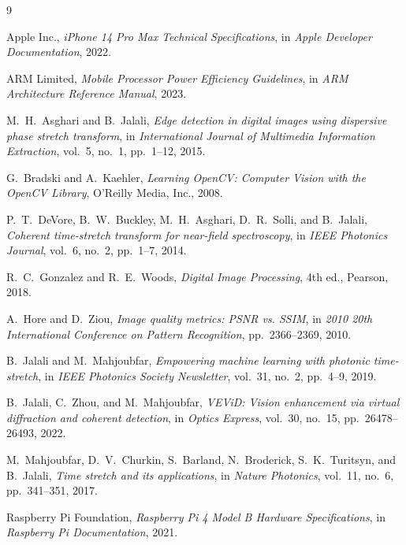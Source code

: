 \documentclass[journal,transmag]{IEEEtran}
\begin{document}
\begin{thebibliography}{9}

Apple Inc.,
\emph{iPhone 14 Pro Max Technical Specifications},
in \emph{Apple Developer Documentation}, 2022.

ARM Limited,
\emph{Mobile Processor Power Efficiency Guidelines},
in \emph{ARM Architecture Reference Manual}, 2023.

M.~H.~Asghari and B.~Jalali, 
\emph{Edge detection in digital images using dispersive phase stretch transform}, 
in \emph{International Journal of Multimedia Information Extraction}, vol.~5, no.~1, pp.~1--12, 2015.

G.~Bradski and A.~Kaehler, 
\emph{Learning OpenCV: Computer Vision with the OpenCV Library}, 
O'Reilly Media, Inc., 2008.

P.~T.~DeVore, B.~W.~Buckley, M.~H.~Asghari, D.~R.~Solli, and B.~Jalali, 
\emph{Coherent time-stretch transform for near-field spectroscopy}, 
in \emph{IEEE Photonics Journal}, vol.~6, no.~2, pp.~1--7, 2014.

R.~C.~Gonzalez and R.~E.~Woods, 
\emph{Digital Image Processing}, 4th ed., Pearson, 2018.

A.~Hore and D.~Ziou, 
\emph{Image quality metrics: PSNR vs. SSIM}, 
in \emph{2010 20th International Conference on Pattern Recognition}, pp.~2366--2369, 2010.

B.~Jalali and M.~Mahjoubfar, 
\emph{Empowering machine learning with photonic time-stretch}, 
in \emph{IEEE Photonics Society Newsletter}, vol.~31, no.~2, pp.~4--9, 2019.

B.~Jalali, C.~Zhou, and M.~Mahjoubfar, 
\emph{VEViD: Vision enhancement via virtual diffraction and coherent detection}, 
in \emph{Optics Express}, vol.~30, no.~15, pp.~26478--26493, 2022.

M.~Mahjoubfar, D.~V.~Churkin, S.~Barland, N.~Broderick, S.~K.~Turitsyn, and B.~Jalali, 
\emph{Time stretch and its applications}, 
in \emph{Nature Photonics}, vol.~11, no.~6, pp.~341--351, 2017.

Raspberry Pi Foundation, 
\emph{Raspberry Pi 4 Model B Hardware Specifications}, 
in \emph{Raspberry Pi Documentation}, 2021.


\end{thebibliography}
\end{document}
